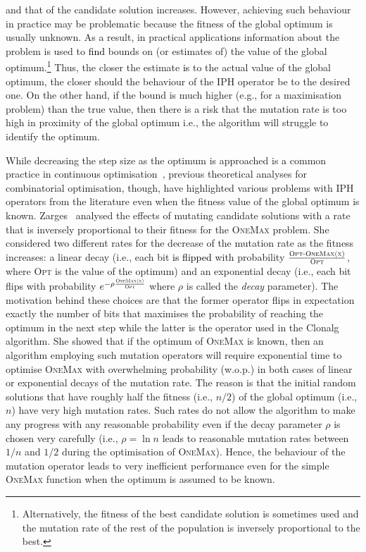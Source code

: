 \documentclass[lettersize,journal]{IEEEtran}
\newcommand{\new}[1]{\textcolor{black}{#1}}
\newcommand{\rev}[1]{\textcolor{black}{#1}}
\newcommand{\rerev}[1]{\textcolor{black}{#1}}
\begin{document}
and that of the candidate solution increases. However, achieving such behaviour in practice may be problematic because the fitness of the global optimum is usually unknown.
As a result, in practical applications information about the problem is used to \new{find} bounds on (or estimates of)  the value of the global optimum\rerev{.}\footnote{Alternatively, the fitness of the best candidate solution is sometimes used and 
	the mutation rate of the rest of the population is inversely proportional to the best.}
Thus, the closer the estimate \rev{is} to the actual value of the global optimum, the closer should the behaviour of the IPH operator be to the desired one.
On the other hand,  if the bound is much higher (e.g., for a maximisation problem)  than the true value, then there is a risk that the mutation rate is too high in proximity of the global optimum 
i.e., the algorithm will struggle to identify the optimum. 

While decreasing the step size as the optimum is approached is \rev{a} common practice in continuous optimisation~\cite{AugerDoerrBook}, previous theoretical analyses for combinatorial optimisation, though, have highlighted various problems with IPH operators from the literature even when the fitness value of the global optimum is known.
Zarges~ \cite{Zarges2008} analysed the effects of mutating candidate solutions with a rate that is inversely proportional to their fitness for the \textsc{OneMax} problem.
She considered two different rates for the decrease of the mutation rate as the fitness increases: a linear decay (i.e., each bit \new{is flipped} with probability $\frac{\textsc{{\color{black}\text{Opt}-}OneMax(x)}}{\textsc{Opt}}$, where \textsc{Opt} is the value of the optimum) 
and an exponential decay (i.e., each bit flips with probability $e^{- \rho \frac{\textsc{OneMax(x)}}{\textsc{Opt}}}$ where $\rho$ is called the {\it decay} parameter).
The motivation behind these choices are that the former operator flips in expectation exactly the number of bits that maximises the probability of reaching the optimum in the next step while the latter is the
operator used in the Clonalg algorithm.  
She showed that if the optimum of \textsc{OneMax} is known, then an algorithm employing such mutation operator\new{s} will require exponential time to optimise \textsc{OneMax} with overwhelming probability (w.o.p.)
in both cases of linear or exponential decays of the mutation rate.
The reason is that the initial random solutions that have roughly half the fitness (i.e., $n/2$) of the global optimum (i.e., $n$) have very high mutation rates. Such rates do not allow the algorithm to make any progress with any reasonable probability even if the decay parameter $\rho$ is chosen very carefully (i.e., $\rho = \ln n$ leads to reasonable mutation rates between $1/n$ and $1/2$ during the optimisation of \textsc{OneMax}).
Hence, the behaviour of the mutation operator leads to very inefficient performance even for the simple \textsc{OneMax} function when the optimum is assumed to be known. 
\end{document}
